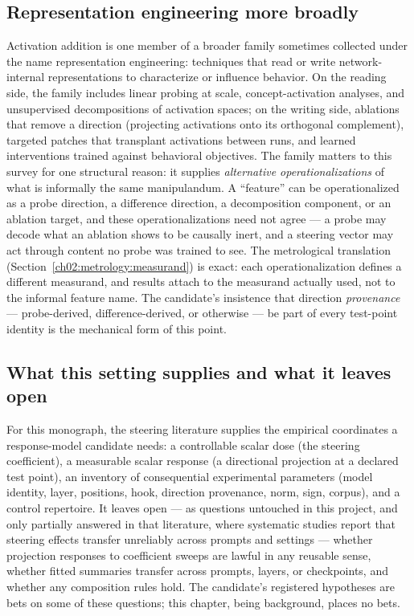 \subsection{Representation engineering more broadly}\label{ch02:steering:repe}

Activation addition is one member of a broader family sometimes collected under the name representation engineering: techniques that read or write network-internal representations to characterize or influence behavior. On the reading side, the family includes linear probing at scale, concept-activation analyses, and unsupervised decompositions of activation spaces; on the writing side, ablations that remove a direction (projecting activations onto its orthogonal complement), targeted patches that transplant activations between runs, and learned interventions trained against behavioral objectives. The family matters to this survey for one structural reason: it supplies \emph{alternative operationalizations} of what is informally the same manipulandum. A ``feature'' can be operationalized as a probe direction, a difference direction, a decomposition component, or an ablation target, and these operationalizations need not agree --- a probe may decode what an ablation shows to be causally inert, and a steering vector may act through content no probe was trained to see. The metrological translation (Section~\ref{ch02:metrology:measurand}) is exact: each operationalization defines a different measurand, and results attach to the measurand actually used, not to the informal feature name. The candidate's insistence that direction \emph{provenance} --- probe-derived, difference-derived, or otherwise --- be part of every test-point identity is the mechanical form of this point.

\subsection{What this setting supplies and what it leaves open}\label{ch02:steering:open}

For this monograph, the steering literature supplies the empirical coordinates a response-model candidate needs: a controllable scalar dose (the steering coefficient), a measurable scalar response (a directional projection at a declared test point), an inventory of consequential experimental parameters (model identity, layer, positions, hook, direction provenance, norm, sign, corpus), and a control repertoire. It leaves open --- as questions untouched in this project, and only partially answered in that literature, where systematic studies report that steering effects transfer unreliably across prompts and settings \cite{tansteering,dasilva} --- whether projection responses to coefficient sweeps are lawful in any reusable sense, whether fitted summaries transfer across prompts, layers, or checkpoints, and whether any composition rules hold. The candidate's registered hypotheses are bets on some of these questions; this chapter, being background, places no bets.

